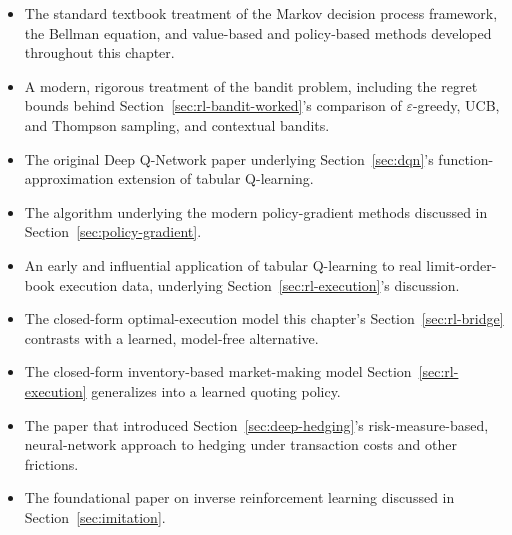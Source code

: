 \documentclass[../ai_in_finance]{subfiles}
\begin{document}

\begin{itemize}
    \item {} The standard textbook treatment of the Markov decision process framework, the Bellman equation, and value-based and policy-based methods developed throughout this chapter.
    \item {} A modern, rigorous treatment of the bandit problem, including the regret bounds behind Section~\ref{sec:rl-bandit-worked}'s comparison of $\varepsilon$-greedy, UCB, and Thompson sampling, and contextual bandits.
    \item {} The original Deep Q-Network paper underlying Section~\ref{sec:dqn}'s function-approximation extension of tabular Q-learning.
    \item {} The algorithm underlying the modern policy-gradient methods discussed in Section~\ref{sec:policy-gradient}.
    \item {} An early and influential application of tabular Q-learning to real limit-order-book execution data, underlying Section~\ref{sec:rl-execution}'s discussion.
    \item {} The closed-form optimal-execution model this chapter's Section~\ref{sec:rl-bridge} contrasts with a learned, model-free alternative.
    \item {} The closed-form inventory-based market-making model Section~\ref{sec:rl-execution} generalizes into a learned quoting policy.
    \item {} The paper that introduced Section~\ref{sec:deep-hedging}'s risk-measure-based, neural-network approach to hedging under transaction costs and other frictions.
    \item {} The foundational paper on inverse reinforcement learning discussed in Section~\ref{sec:imitation}.
\end{itemize}
\end{document}
